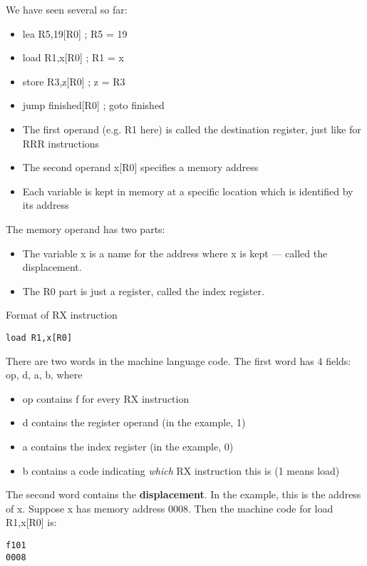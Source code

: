\documentclass[11pt]{article}
\begin{document}
\begin{itemize}
We have seen several so far:

\begin{itemize}
\item lea  R5,19[R0]  ; R5 = 19
\item load R1,x[R0]  ; R1 = x
\item store R3,z[R0] ; z = R3
\item jump  finished[R0] ; goto finished

\item The first operand (e.g. R1 here) is called the destination
register, just like for RRR instructions
\item The second operand x[R0] specifies a memory address
\item Each variable is kept in memory at a specific location which is
identified by its address
\end{itemize}

The memory operand has two parts:

\begin{itemize}
\item The variable x is a name for the address where x is kept --- called
the displacement.
\item The R0 part is just a register, called the index register.
\end{itemize}

Format of RX instruction
\begin{verbatim}
load R1,x[R0]
\end{verbatim}

There are two words in the machine language code.
The first word has 4 fields: op, d, a, b, where

\begin{itemize}
\item op contains f for every RX instruction
\item d contains the register operand (in the example, 1)
\item a contains the index register (in the example, 0)
\item b contains a code indicating \emph{which} RX instruction this is (1
means load)
\end{itemize}

The second word contains the \textbf{displacement}.  In the example, this is
the address of x.  Suppose x has memory address 0008.  Then the
machine code for load R1,x[R0] is:

\begin{verbatim}
f101
0008
\end{verbatim}


\end{itemize}
\end{document}
